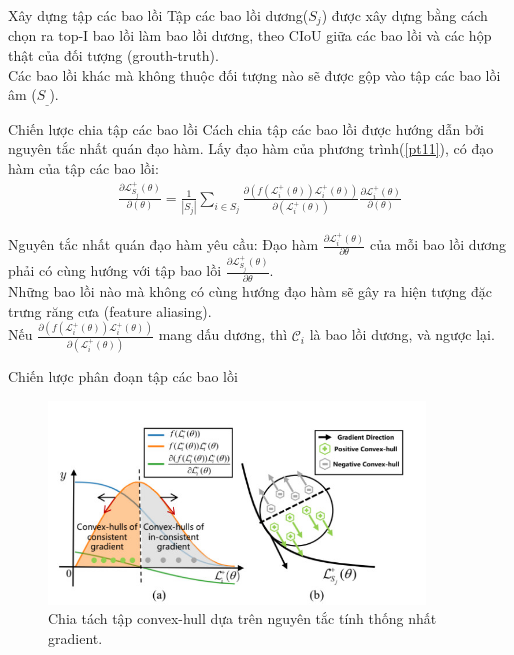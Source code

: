 \documentclass[11pt]{beamer}
\theoremstyle{definition}
\theoremstyle{plain}
\theoremstyle{plain}
\theoremstyle{remark}
\begin{document}
	\begin{frame}{Xây dựng tập các bao lồi}
		Tập các bao lồi dương($S_j$) được xây dựng bằng cách chọn ra $\text{top-I}$ bao lồi làm bao lồi dương, theo CIoU giữa các bao lồi và các hộp thật của đối tượng (grouth-truth).\\
		Các bao lồi khác mà không thuộc đối tượng nào sẽ được gộp vào tập các bao lồi âm ($S_{\_}$).
	\end{frame}
	
	
	
	\begin{frame}{Chiến lược chia tập các bao lồi}
		Cách chia tập các bao lồi được hướng dẫn bởi nguyên tắc nhất quán đạo hàm. Lấy đạo hàm của phương trình(\ref{pt11}), có đạo hàm của tập các bao lồi:
		\begin{align} \label{ptdd7}
			\frac{\partial\mathcal{L}_{S_j}^+ (\theta)}{\partial (\theta)} = \frac{1}{|S_j|} \sum_{i \in {S_j}} \frac{\partial (f(\mathcal{L}_i^+(\theta))\mathcal{L}_i^{+}(\theta))}{\partial (\mathcal{L}_i^+(\theta))} \frac{\partial \mathcal{L}_i^+ (\theta)}{\partial (\theta)}
		\end{align}
		
	\end{frame}
	
	\begin{frame}
		Nguyên tắc nhất quán đạo hàm yêu cầu: Đạo hàm $\frac{\partial \mathcal{L}_i^{+}(\theta)}{\partial \theta}$ của mỗi bao lồi dương phải có cùng hướng với tập bao lồi 
		$\frac{\partial \mathcal{L}_{S_j}^{+}(\theta)}{\partial \theta}$.\\
		Những bao lồi nào mà không có cùng hướng đạo hàm sẽ gây ra hiện tượng đặc trưng răng cưa (feature aliasing). \\
		
		Nếu $\frac{\partial\left(f\left(\mathcal{L}_i^{+}(\theta)\right) \mathcal{L}_i^{+}(\theta)\right)}{\partial\left(\mathcal{L}_i^{+}(\theta)\right)}$ mang dấu dương, thì $\mathcal{C}_i$ là bao lồi dương, và ngược lại.
	\end{frame}
	
	\begin{frame}{Chiến lược phân đoạn tập các bao lồi}
		
		\begin{figure}[ht!]
			\begin{center}
				\includegraphics[width=10cm]{./Hinh_9.jpg}
				\caption{Chia tách tập convex-hull dựa trên nguyên tắc tính thống nhất gradient.}
				\label{upper_convex_function}
			\end{center}
		\end{figure}
		
	\end{frame}
	
\end{document}
